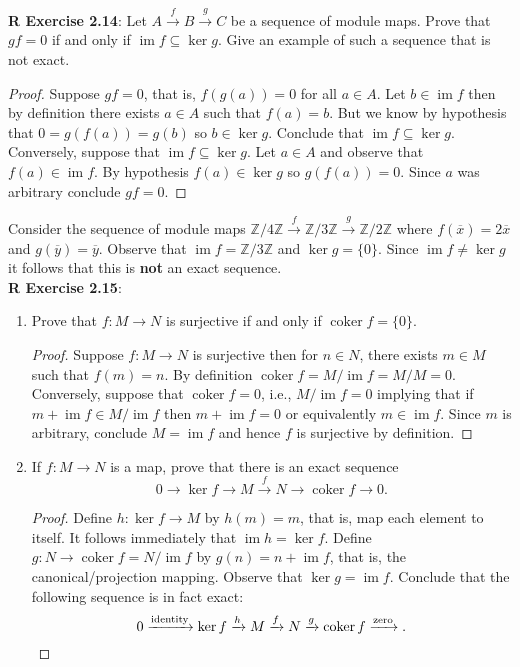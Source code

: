 \documentclass[8pt]{amsart}
\theoremstyle{plain}%
\theoremstyle{definition}
\theoremstyle{remark}
\numberwithin{equation}{section}
\newcommand{\Z}{\mathbb{Z}}
\newcommand{\im}{\operatorname{im}}
\newcommand{\coker}{\operatorname{coker}}
\begin{document}
\textbf{R Exercise 2.14}: Let $A \xrightarrow f B \xrightarrow g C$ be a sequence of module maps. Prove that $gf = 0$ if and only if $\im f \subseteq \ker g$.  Give an example of such a sequence that is not exact.
	\begin{proof}
		Suppose $gf = 0$, that is, $f(g(a)) = 0$ for all $a \in A$. Let $b \in \im f$ then by definition there exists $a \in A$ such that $f(a) = b$. But we know by hypothesis that $0 = g(f(a)) = g(b)$ so $b \in \ker g$. Conclude that $\im f \subseteq \ker g$. Conversely, suppose that $\im f \subseteq \ker g$. Let $a \in A$ and observe that $f(a) \in \im f$. By hypothesis $f(a) \in \ker g$ so $g(f(a)) = 0$. Since $a$ was arbitrary conclude $gf = 0$.
	\end{proof}
	Consider the sequence of module maps $\Z/4\Z \xrightarrow f \Z/3\Z \xrightarrow g \Z/2\Z$ where $f(\overline x) = 2 \overline x$ and $g(\overline y) = \overline y$. Observe that $\im f = \Z/3\Z$  and $\ker g = \{0\}$. Since $\im f \neq \ker g$ it follows that this is \textbf{not} an exact sequence.\\

\textbf{R Exercise 2.15}:
	\begin{enumerate}
		\item Prove that $f : M \to N$ is surjective if and only if $\coker f = \{0\}$.
			\begin{proof}
				Suppose $f : M \to N$ is surjective then for $n \in N$, there exists $m \in M$ such that $f(m) = n$. By definition $\coker f = M/\im f = M/M = 0$. Conversely, suppose that $\coker f = 0$, i.e., $M/\im f = 0$ implying that if $m + \im f \in M/\im f$ then $m + \im f = 0$ or equivalently $m \in \im f$. Since $m$ is arbitrary, conclude $M = \im f$ and hence $f$ is surjective by definition.
			\end{proof}
		\item If $f : M \to N$ is a map, prove that there is an exact sequence $$ 0 \rightarrow \ker f \rightarrow M \xrightarrow f N \rightarrow \coker f \rightarrow 0.$$
			\begin{proof}
				Define $h : \ker f \to M$ by $h(m) = m$, that is, map each element to itself. It follows immediately that $\im h = \ker f$. Define $g : N \to \coker f = N/\im f$ by $g(n) = n + \im f$, that is, the canonical/projection mapping. Observe that $\ker g = \im f$. Conclude that the following sequence is in fact exact: $$0 \xrightarrow{\text{identity}} \ker f \xrightarrow h M \xrightarrow f N \xrightarrow g \coker f \xrightarrow{\text{zero}}. \qedhere$$
			\end{proof}
	\end{enumerate}
\end{document}
